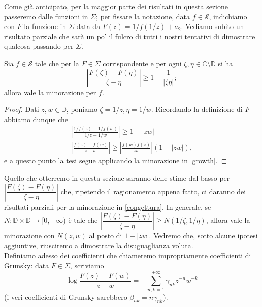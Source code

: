 Come già anticipato, per la maggior parte dei risultati in questa sezione passeremo dalle funzioni in $\Sigma$; per fissare la notazione, data $f \in \mathcal{S}$, indichiamo con $F$ la funzione in $\Sigma$ data da $F(z)=1/f(1/z)+a_2$. Vediamo subito un risultato parziale che sarà un po' il fulcro di tutti i nostri tentativi di dimostrare qualcosa passando per $\Sigma$.

\begin{prop} \label{passaggio}
  Sia $f \in \mathcal{S}$ tale che per la $F \in \Sigma$ corrispondente e per ogni $\zeta,\eta \in \mathbb{C}\setminus\overline{\mathbb{D}}$ si ha
  $$\left|\frac{F(\zeta)-F(\eta)}{\zeta-\eta}\right| \ge 1-\frac{1}{|\zeta\eta|};$$
  allora vale la minorazione per $f$.
\end{prop}

\begin{proof}
  Dati $z,w \in \mathbb{D}$, poniamo $\zeta=1/z, \eta=1/w$. Ricordando la definizione di $F$ abbiamo dunque che
  \begin{gather*}
    \left|\frac{1/f(z)-1/f(w)}{1/z-1/w}\right| \ge 1-|zw| \\
    \left|\frac{f(z)-f(w)}{z-w}\right| \ge \left|\frac{f(w)f(z)}{zw}\right| (1-|zw|),
  \end{gather*}
  e a questo punto la tesi segue applicando la minorazione in \eqref{growth}.
\end{proof}

Quello che otterremo in questa sezione saranno delle stime dal basso per $\left|\dfrac{F(\zeta)-F(\eta)}{\zeta-\eta}\right|$ che, ripetendo il ragionamento appena fatto, ci daranno dei risultati parziali per la minorazione in \eqref{congettura}.
In generale, se $N: \mathbb{D}\times \mathbb{D} \longrightarrow [0,+\infty)$ è tale che $\left|\dfrac{F(\zeta)-F(\eta)}{\zeta-\eta}\right| \ge N(1/\zeta,1/\eta)$, allora vale la minorazione con $N(z,w)$ al posto di $1-|zw|$. Vedremo che, sotto alcune ipotesi aggiuntive, riusciremo a dimostrare la disuguaglianza voluta. \\

Definiamo adesso dei coefficienti che chiameremo impropriamente coefficienti di Grunsky: data $F \in \Sigma$, scriviamo
$$\log{\frac{F(z)-F(w)}{z-w}}=-\sum_{n,k=1}^{+\infty} \gamma_{nk}z^{-n}w^{-k}$$
(i veri coefficienti di Grunsky sarebbero $\beta_{nk}=n\gamma_{nk}$).

